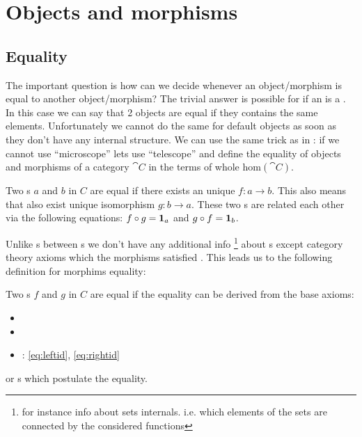 \chapter{Objects and morphisms}

\section{Equality}

The important question is how can we decide whenever an
object/morphism is equal to another object/morphism? The trivial
answer is possible for if an  is a
. In this case we can say that 2 objects are equal
if they contains the same elements. Unfortunately we cannot do the
same for default objects as soon as they don't have any internal
structure. We can use the same trick as in
: if we cannot use ``microscope'' lets
use ``telescope'' and define the equality of objects and morphisms of
a category $\cat{C}$ in the terms of whole $\mathrm{hom}(\cat{C})$.

\begin{definition}
\label{def:object_equality}
Two s $a$ and $b$ in 
$C$ are equal if there exists an unique 
$f: a \to b$. This also means that also exist unique isomorphism $g: b
\to a$. These two s are related each other via
the following equations: $f \circ g = \idarrow[a]$ and $g \circ f
= \idarrow[b]$. 
\end{definition}

Unlike s between s we don't
have any additional info 
\footnote{
for instance info about sets internals. i.e. which elements of the sets
are connected by the considered functions
}
about s except
category theory axioms which the morphisms satisfied
\cite{bib:stackexchange:morphism:equality}. This leads us to the
following definition for morphims equality:
\begin{definition}
\label{def:morphism_equality}
Two s $f$ and $g$ in 
$C$ are equal if the equality can be derived from the base axioms: 
\begin{itemize}
\item {}
\item {}
\item {}: \eqref{eq:leftid}, \eqref{eq:rightid}
\end{itemize}
or s which postulate the equality.
\end{definition}

